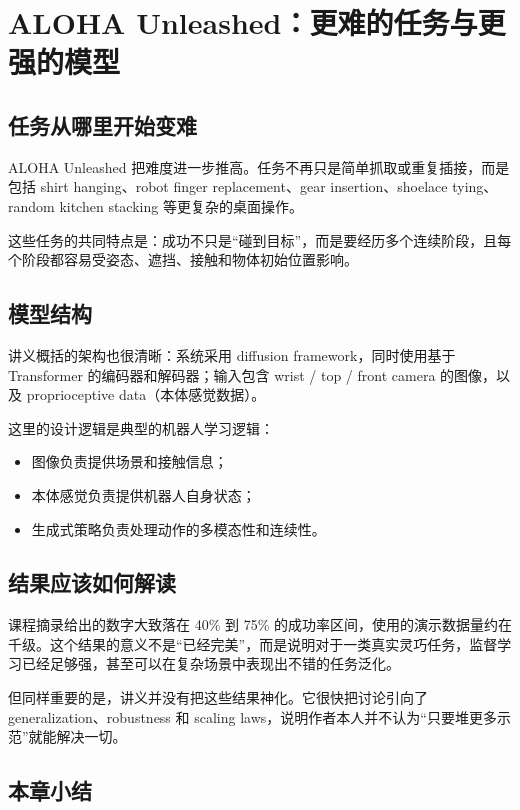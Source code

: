 \documentclass[a4paper]{article}
\begin{document}
\section{ALOHA Unleashed：更难的任务与更强的模型}

\subsection{任务从哪里开始变难}

ALOHA Unleashed 把难度进一步推高。任务不再只是简单抓取或重复插接，而是包括 shirt hanging、robot finger replacement、gear insertion、shoelace tying、random kitchen stacking 等更复杂的桌面操作。

这些任务的共同特点是：成功不只是“碰到目标”，而是要经历多个连续阶段，且每个阶段都容易受姿态、遮挡、接触和物体初始位置影响。

\subsection{模型结构}

讲义概括的架构也很清晰：系统采用 diffusion framework，同时使用基于 Transformer 的编码器和解码器；输入包含 wrist / top / front camera 的图像，以及 proprioceptive data（本体感觉数据）。

这里的设计逻辑是典型的机器人学习逻辑：
\begin{itemize}
  \item 图像负责提供场景和接触信息；
  \item 本体感觉负责提供机器人自身状态；
  \item 生成式策略负责处理动作的多模态性和连续性。
\end{itemize}

\subsection{结果应该如何解读}

课程摘录给出的数字大致落在 40\% 到 75\% 的成功率区间，使用的演示数据量约在千级。这个结果的意义不是“已经完美”，而是说明对于一类真实灵巧任务，监督学习已经足够强，甚至可以在复杂场景中表现出不错的任务泛化。

但同样重要的是，讲义并没有把这些结果神化。它很快把讨论引向了 generalization、robustness 和 scaling laws，说明作者本人并不认为“只要堆更多示范”就能解决一切。

\subsection{本章小结}
\end{document}
